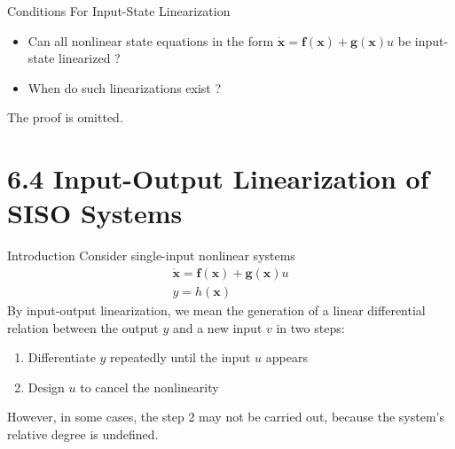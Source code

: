 \documentclass{beamer}
\renewcommand{\vec}[1]{\ensuremath{\boldsymbol{#1}}} %
\begin{document}
\begin{frame}{Conditions For Input-State Linearization}
    \begin{itemize}
      \item Can all nonlinear state equations in the form $ \dot{\vec{x}}=\vec{f}(\vec{x}) + \vec{g}(\vec{x})u $ be input-state linearized ?
      \item When do such linearizations exist ?
    \end{itemize}

    The proof is omitted.
\end{frame}


\section{6.4  Input-Output Linearization of SISO Systems}

\begin{frame}{Introduction}
    Consider single-input nonlinear systems
        \begin{equation}\label{nonlinear-system}
        \begin{array}{l}{\dot{\vec{x}}=\vec{f}(\vec{x})+\vec{g}(\vec{x}) u} \\ {y=h(\vec{x})}\end{array}
        \end{equation}
    By input-output linearization, we mean the generation of a {\color{red}linear differential relation} between the output $y$ and a new input $v$ in two steps:
    \begin{enumerate}
      \item Differentiate $y$ repeatedly until the input $u$ appears
      \item Design $u$ to cancel the nonlinearity
    \end{enumerate}
    However, in some cases, the step 2 may not be carried out, because the system's {\color{red}relative degree is undefined}.
\end{frame}
\end{document}
